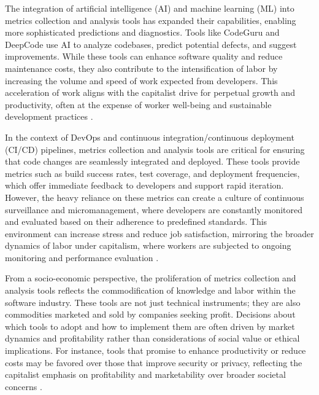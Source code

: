 \begin{refsection}
The integration of artificial intelligence (AI) and machine learning (ML) into metrics collection and analysis tools has expanded their capabilities, enabling more sophisticated predictions and diagnostics. Tools like CodeGuru and DeepCode use AI to analyze codebases, predict potential defects, and suggest improvements. While these tools can enhance software quality and reduce maintenance costs, they also contribute to the intensification of labor by increasing the volume and speed of work expected from developers. This acceleration of work aligns with the capitalist drive for perpetual growth and productivity, often at the expense of worker well-being and sustainable development practices \cite[pp.~176-178]{Humble2019ContinuousDelivery}.

In the context of DevOps and continuous integration/continuous deployment (CI/CD) pipelines, metrics collection and analysis tools are critical for ensuring that code changes are seamlessly integrated and deployed. These tools provide metrics such as build success rates, test coverage, and deployment frequencies, which offer immediate feedback to developers and support rapid iteration. However, the heavy reliance on these metrics can create a culture of continuous surveillance and micromanagement, where developers are constantly monitored and evaluated based on their adherence to predefined standards. This environment can increase stress and reduce job satisfaction, mirroring the broader dynamics of labor under capitalism, where workers are subjected to ongoing monitoring and performance evaluation \cite[pp.~54-57]{Feathers2004WorkingEffectively}.

From a socio-economic perspective, the proliferation of metrics collection and analysis tools reflects the commodification of knowledge and labor within the software industry. These tools are not just technical instruments; they are also commodities marketed and sold by companies seeking profit. Decisions about which tools to adopt and how to implement them are often driven by market dynamics and profitability rather than considerations of social value or ethical implications. For instance, tools that promise to enhance productivity or reduce costs may be favored over those that improve security or privacy, reflecting the capitalist emphasis on profitability and marketability over broader societal concerns \cite[pp.~102-105]{Martin2018CleanArchitecture}.


\end{refsection}
